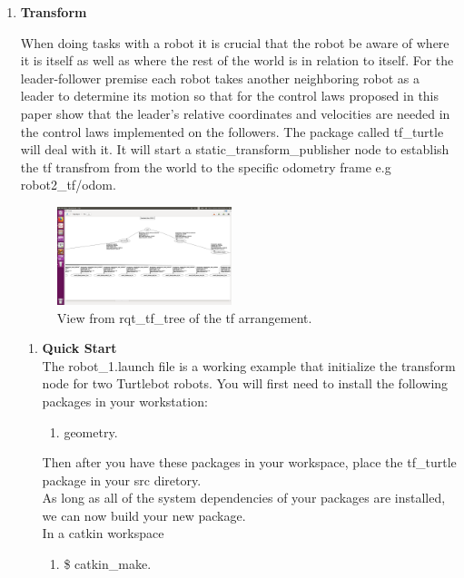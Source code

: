 \documentclass[journal]{IEEEtran}
\begin{document}
\begin{enumerate}
\begin{enumerate}
\end{enumerate}



\item \textbf {Transform}

When doing tasks with a robot it is crucial that the robot be
aware of where it is itself as well as where the rest of the world
is in relation to itself. For the leader-follower premise each robot takes another neighboring robot as a leader to determine its motion so that for the control laws proposed in this paper show that the leader’s relative coordinates and velocities are needed in the control laws implemented on the followers. The package called tf{\_}turtle will deal with it. It will start a static{\_}transform{\_}publisher node to establish the tf transfrom from the world to the specific odometry frame e.g robot2{\_}tf/odom.

\begin{figure}[!h]
\begin{center}
\includegraphics[width=2in]{3.png}
\caption{View from rqt{\_}tf{\_}tree of the tf arrangement.}
\end{center}
\label{fig:mypicture4}
\end{figure}


\begin{enumerate}
\item \textbf {Quick Start}\\
The robot{\_}1.launch file is a working example that initialize the transform node for two Turtlebot robots.
You will first need to install the following packages in your workstation:
\begin{enumerate}
\item {geometry}\cite{temp10}.

\end{enumerate}

Then after you have these packages in your workspace, place the tf{\_}turtle\cite{temp11} package in your src diretory.\\
As long as all of the system dependencies of your packages are installed, we can now build your new package.\\
In a catkin workspace
\begin{enumerate} 
\item {{\$} catkin{\_}make}.
\end{enumerate}


\end{enumerate}
\end{enumerate}
\end{document}
